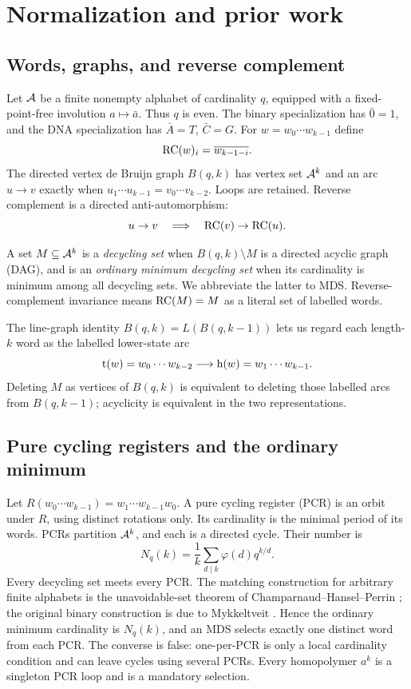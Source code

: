 \section{Normalization and prior work}
\label{sec:normalization}

\subsection{Words, graphs, and reverse complement}

Let $\mathcal A$ be a finite nonempty alphabet of cardinality $q$, equipped with a
fixed-point-free involution $a\mapsto\bar a$.  Thus $q$ is even.  The binary
specialization has $\bar0=1$, and the DNA specialization has
$\bar A=T$, $\bar C=G$.  For $w=w_0\cdots w_{k-1}$ define
\[
  \operatorname{RC}(w)_i=\overline{w_{k-1-i}}.
\]
The directed vertex de Bruijn graph $B(q,k)$ has vertex set $\mathcal A^k$ and an
arc $u\to v$ exactly when
$u_1\cdots u_{k-1}=v_0\cdots v_{k-2}$.  Loops are retained.  Reverse
complement is a directed anti-automorphism:
\[
  u\to v \quad\Longrightarrow\quad \operatorname{RC}(v)\to\operatorname{RC}(u).
\]

A set $M\subseteq\mathcal A^k$ is a \emph{decycling set} when
$B(q,k)\setminus M$ is a directed acyclic graph (DAG), and is an
\emph{ordinary minimum decycling set} when its cardinality is minimum among
all decycling sets.  We abbreviate the latter to MDS.  Reverse-complement
invariance means $\operatorname{RC}(M)=M$ as a literal set of labelled words.

The line-graph identity $B(q,k)=L(B(q,k-1))$ lets us regard each length-$k$
word as the labelled lower-state arc
\[
  \operatorname{t}(w)=w_0\cdots w_{k-2}\longrightarrow
  \operatorname{h}(w)=w_1\cdots w_{k-1}.
\]
Deleting $M$ as vertices of $B(q,k)$ is equivalent to deleting those labelled
arcs from $B(q,k-1)$; acyclicity is equivalent in the two representations.

\subsection{Pure cycling registers and the ordinary minimum}

Let $R(w_0\cdots w_{k-1})=w_1\cdots w_{k-1}w_0$.  A pure cycling register
(PCR) is an orbit under $R$, using distinct rotations only.  Its cardinality
is the minimal period of its words.  PCRs partition $\mathcal A^k$, and each is a
directed cycle.  Their number is
\begin{equation}
  N_q(k)=\frac1k\sum_{d\mid k}\varphi(d)q^{k/d}.
  \label{eq:necklace}
\end{equation}
Every decycling set meets every PCR.  The matching construction for arbitrary
finite alphabets is the unavoidable-set theorem of
Champarnaud--Hansel--Perrin \cite{ChamparnaudHanselPerrin2004}; the original
binary construction is due to Mykkeltveit \cite{Mykkeltveit1972}.  Hence the
ordinary minimum cardinality is $N_q(k)$, and an MDS selects exactly one
distinct word from each PCR.  The converse is false: one-per-PCR is only a
local cardinality condition and can leave cycles using several PCRs.  Every
homopolymer $a^k$ is a singleton PCR loop and is a mandatory selection.

